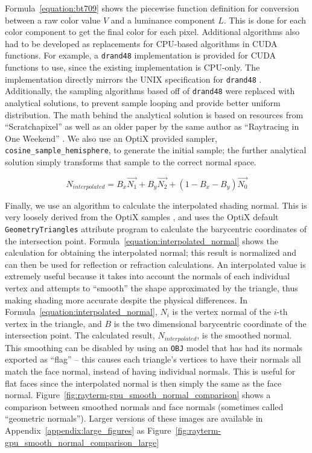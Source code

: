 Formula~\ref{equation:bt709} shows the piecewise function definition for conversion between a raw color value $V$ and a luminance component $L$.
This is done for each color component to get the final color for each pixel.
Additional algorithms also had to be developed as replacements for CPU-based algorithms in CUDA functions.
For example, a \texttt{drand48} implementation is provided for CUDA functions to use, since the existing implementation is CPU-only.
The implementation directly mirrors the UNIX specification for \texttt{drand48} \cite{drand48UNIX}.
Additionally, the sampling algorithms based off of \texttt{drand48} were replaced with analytical solutions, to prevent sample looping and provide better uniform distribution.
The math behind the analytical solution is based on resources from ``Scratchapixel'' as well as an older paper by the same author as ``Raytracing in One Weekend'' \cite{prunier2017global, shirley1997map}.
We also use an OptiX provided sampler, \texttt{cosine\_sample\_hemisphere}, to generate the initial sample; the further analytical solution simply transforms that sample to the correct normal space.

\begin{equation}
\label{equation:interpolated_normal}
  N_{interpolated} = B_{x} \vec{N_{1}} + B_{y} \vec{N_{2}} + (1 - B_{x} - B_{y}) \vec{N_{0}}
\end{equation}

Finally, we use an algorithm to calculate the interpolated shading normal.
This is very loosely derived from the OptiX samples \cite{optixsamples}, and uses the OptiX default \texttt{GeometryTriangles} attribute program to calculate the barycentric coordinates of the intersection point.
Formula~\ref{equation:interpolated_normal} shows the calculation for obtaining the interpolated normal; this result is normalized and can then be used for reflection or refraction calculations.
An interpolated value is extremely useful because it takes into account the normals of each individual vertex and attempts to ``smooth'' the shape approximated by the triangle, thus making shading more accurate despite the physical differences.
In Formula~\ref{equation:interpolated_normal}, $N_{i}$ is the vertex normal of the $i$-th vertex in the triangle, and $B$ is the two dimensional barycentric coordinate of the intersection point.
The calculated result, $N_{interpolated}$, is the smoothed normal.
This smoothing can be disabled by using an \texttt{OBJ} model that has had its normals exported as ``flag'' -- this causes each triangle's vertices to have their normals all match the face normal, instead of having individual normals.
This is useful for flat faces since the interpolated normal is then simply the same as the face normal.
Figure~\ref{fig:rayterm-gpu_smooth_normal_comparison} shows a comparison between smoothed normals and face normals (sometimes called ``geometric normals'').
Larger versions of these images are available in Appendix~\ref{appendix:large_figures} as Figure~\ref{fig:rayterm-gpu_smooth_normal_comparison_large}

